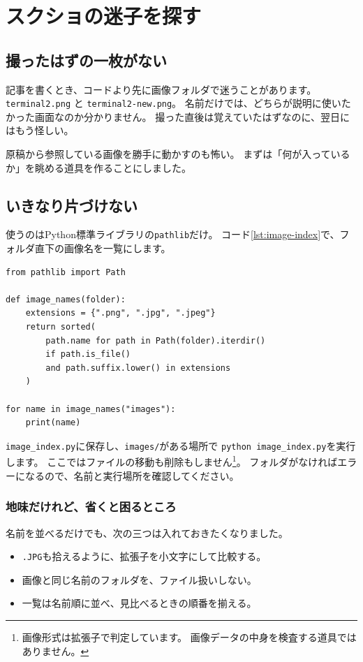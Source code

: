 \chapter{スクショの迷子を探す}
\label{chap:python}
\chapterauthor{\AuthorOne}

\section{撮ったはずの一枚がない}
記事を書くとき、コードより先に画像フォルダで迷うことがあります。
\texttt{terminal2.png} と \texttt{terminal2-new.png}。
名前だけでは、どちらが説明に使いたかった画面なのか分かりません。
撮った直後は覚えていたはずなのに、翌日にはもう怪しい。

原稿から参照している画像を勝手に動かすのも怖い。
まずは「何が入っているか」を眺める道具を作ることにしました。

\section{いきなり片づけない}
使うのはPython標準ライブラリの\texttt{pathlib}だけ\cite{python:pathlib}。
コード\ref{lst:image-index}で、フォルダ直下の画像名を一覧にします。

\begin{lstlisting}[float=htbp,caption={画像を変更せず、名前だけを一覧にする},label={lst:image-index}]
from pathlib import Path

def image_names(folder):
    extensions = {".png", ".jpg", ".jpeg"}
    return sorted(
        path.name for path in Path(folder).iterdir()
        if path.is_file()
        and path.suffix.lower() in extensions
    )

for name in image_names("images"):
    print(name)
\end{lstlisting}

\texttt{image\_index.py}に保存し、\texttt{images/}がある場所で
\texttt{python image\_index.py}を実行します。
ここではファイルの移動も削除もしません\footnote{画像形式は拡張子で判定しています。
画像データの中身を検査する道具ではありません。}。
フォルダがなければエラーになるので、名前と実行場所を確認してください。

\subsection{地味だけれど、省くと困るところ}
名前を並べるだけでも、次の三つは入れておきたくなりました。
\begin{itemize}
  \item \texttt{.JPG}も拾えるように、拡張子を小文字にして比較する。
  \item 画像と同じ名前のフォルダを、ファイル扱いしない。
  \item 一覧は名前順に並べ、見比べるときの順番を揃える。
\end{itemize}

